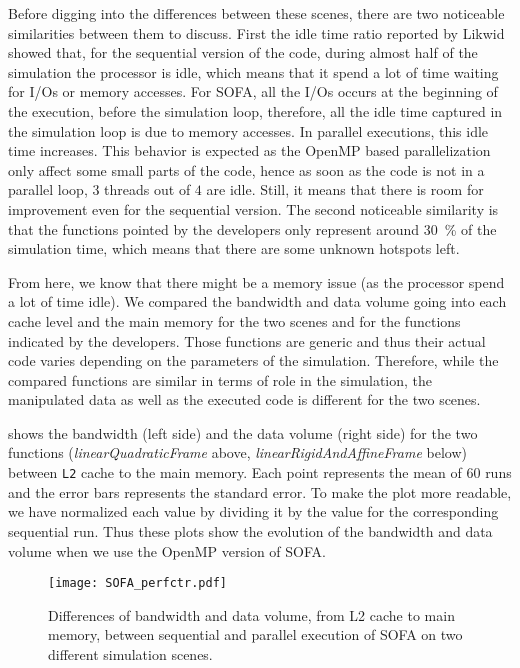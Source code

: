 Before digging into the differences between these scenes, there are two noticeable similarities between them to discuss.
First the idle time ratio reported by \gls{Likwid} showed that, for the sequential version of the code, during almost half of the simulation the processor is idle, which means that it spend a lot of time waiting for \glspl{I/O} or memory accesses.
For \gls{SOFA}, all the \glspl{I/O} occurs at the beginning of the execution, before the simulation loop, therefore, all the idle time captured in the simulation loop is due to memory accesses.
In parallel executions,  this idle time increases.
This behavior is expected as the \gls{OpenMP} based parallelization only affect some small parts of the code, hence as soon as the code is not in a parallel loop, $3$ threads out of $4$ are idle.
Still, it means that there is room for improvement even for the sequential version.
The second noticeable similarity is that the functions pointed by the developers only represent around \SI{30}{\%} of the simulation time, which means that there are some unknown hotspots left.

From here, we know that there might be a memory issue (as the processor spend a lot of time idle).
We compared the bandwidth and data volume going into each cache level and the main memory for the two scenes and for the functions indicated by the developers.
Those functions are generic and thus their actual code varies depending on the parameters of the simulation.
Therefore, while the compared functions are similar in terms of role in the simulation, the manipulated data as well as the executed code is different for the two scenes.

 shows the bandwidth (left side) and the data volume (right side) for the two functions (\emph{linearQuadraticFrame} above, \emph{linearRigidAndAffineFrame} below) between \texttt{L2} cache to the main memory.
Each point represents the mean of $60$ runs and the error bars represents the standard error.
To make the plot more readable, we have normalized each value by dividing it by the value for the corresponding sequential run.
Thus these plots show the evolution of the bandwidth and data volume when we use the \gls{OpenMP} version of \gls{SOFA}.

\begin{figure}[htb]
    \centering
    \texttt{[image: SOFA\_perfctr.pdf]}
    \caption[SOFA likwid results.]{Differences of bandwidth and data volume, from L2 cache to main memory, between sequential and parallel execution of \gls{SOFA} on two different simulation scenes.
        \\
    }
    \label{fig:SOFA-perfctr}
\end{figure}

